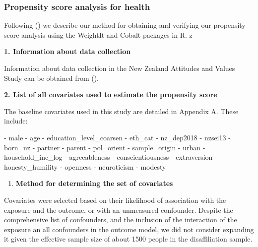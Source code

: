 \documentclass[
  singlecolumn,
  9pt]{article}
\newenvironment{Shaded}{\begin{snugshade}}{\end{snugshade}}
\newcommand{\NormalTok}[1]{\textcolor[rgb]{0.00,0.23,0.31}{#1}}
\newcommand{\SpecialStringTok}[1]{\textcolor[rgb]{0.13,0.47,0.30}{#1}}
\providecommand{\tightlist}{%
  \setlength{\itemsep}{0pt}\setlength{\parskip}{0pt}}\usepackage{longtable,booktabs,array}
\begin{document}
\subsubsection{Propensity score analysis for
health}\label{propensity-score-analysis-for-health}

Following () we
describe our method for obtaining and verifying our propensity score
analysis using the WeightIt and Cobalt packages in R. z

\textbf{1. Information about data collection}

Information about data collection in the New Zealand Attitudes and
Values Study can be obtained from ().

\textbf{2. List of all covariates used to estimate the propensity score}

The baseline covariates used in this study are detailed in Appendix A.
These include:

\begin{Shaded}
\begin{Highlighting}[]
\SpecialStringTok{{-} }\NormalTok{male}
\SpecialStringTok{{-} }\NormalTok{age}
\SpecialStringTok{{-} }\NormalTok{education\_level\_coarsen}
\SpecialStringTok{{-} }\NormalTok{eth\_cat}
\SpecialStringTok{{-} }\NormalTok{nz\_dep2018}
\SpecialStringTok{{-} }\NormalTok{nzsei13}
\SpecialStringTok{{-} }\NormalTok{born\_nz}
\SpecialStringTok{{-} }\NormalTok{partner}
\SpecialStringTok{{-} }\NormalTok{parent}
\SpecialStringTok{{-} }\NormalTok{pol\_orient}
\SpecialStringTok{{-} }\NormalTok{sample\_origin}
\SpecialStringTok{{-} }\NormalTok{urban}
\SpecialStringTok{{-} }\NormalTok{household\_inc\_log}
\SpecialStringTok{{-} }\NormalTok{agreeableness}
\SpecialStringTok{{-} }\NormalTok{conscientiousness}
\SpecialStringTok{{-} }\NormalTok{extraversion}
\SpecialStringTok{{-} }\NormalTok{honesty\_humility}
\SpecialStringTok{{-} }\NormalTok{openness}
\SpecialStringTok{{-} }\NormalTok{neuroticism}
\SpecialStringTok{{-} }\NormalTok{modesty}
\end{Highlighting}
\end{Shaded}

\begin{enumerate}
\def\labelenumi{\arabic{enumi}.}
\setcounter{enumi}{2}
\tightlist
\item
  \textbf{Method for determining the set of covariates}
\end{enumerate}

Covariates were selected based on their likelihood of association with
the exposure and the outcome, or with an unmeasured confounder. Despite
the comprehensive list of confounders, and the inclusion of the
interaction of the exposure an all confounders in the outcome model, we
did not consider expanding it given the effective sample size of about
1500 people in the disaffiliation sample.
\end{document}
